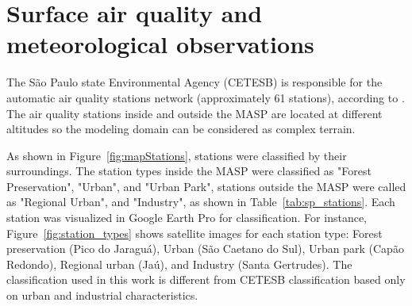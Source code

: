   \section{Surface air quality and meteorological observations}
  The São Paulo state Environmental Agency (CETESB) is responsible for the automatic air quality stations network (approximately 61 stations), according to \citet{CETESB2019}.
  The air quality stations inside and outside the MASP are located at different altitudes so the modeling domain can be considered as complex terrain.
  
  As shown in Figure~\ref{fig:mapStations}, stations were classified by their surroundings.
  The station types inside the MASP were classified as "Forest Preservation", "Urban", and "Urban Park",  stations outside the MASP were called as "Regional Urban", and "Industry", as shown in Table~\ref{tab:sp_stations}.
  Each station was visualized in Google Earth Pro for classification.
  For instance, Figure~\ref{fig:station_types} shows satellite images for each station type: Forest preservation (Pico do Jaraguá), Urban (São Caetano do Sul), Urban park (Capão Redondo), Regional urban (Jaú), and Industry (Santa Gertrudes).
The classification used in this work is different from CETESB classification based only on urban and industrial characteristics.

